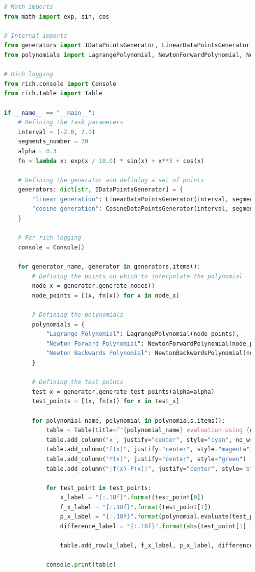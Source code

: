 \documentclass[12pt]{extarticle}
\begin{document}
\begin{lstlisting}[language=Python, caption=Реалізація побудови таблиць з результатами]
# Math imports
from math import exp, sin, cos

# Internal imports
from generators import IDataPointsGenerator, LinearDataPointsGenerator, CosineDataPointsGenerator
from polynomials import LagrangePolynomial, NewtonForwardPolynomial, NewtonBackwardsPolynomial

# Rich logging
from rich.console import Console
from rich.table import Table

if __name__ == "__main__":
    # Defining the task parameters
    interval = (-2.0, 2.0)
    segments_number = 20
    alpha = 0.3
    fn = lambda x: exp(x / 10.0) * sin(x) + x**3 + cos(x)
    
    # Defining the generator and defining a set of points
    generators: dict[str, IDataPointsGenerator] = {
        "linear generation": LinearDataPointsGenerator(interval, segments_number),
        "cosine generation": CosineDataPointsGenerator(interval, segments_number)
    }
    
    # For rich logging
    console = Console()
    
    for generator_name, generator in generators.items():
        # Defining the points on which to interpolate the polynomial
        node_x = generator.generate_nodes()
        node_points = [(x, fn(x)) for x in node_x]
        
        # Defining the polynomials
        polynomials = {
            "Lagrange Polynomial": LagrangePolynomial(node_points),
            "Newton Forward Polynomial": NewtonForwardPolynomial(node_points),
            "Newton Backwards Polynomial": NewtonBackwardsPolynomial(node_points)
        }
        
        # Defining the test points
        test_x = generator.generate_test_points(alpha=alpha)
        test_points = [(x, fn(x)) for x in test_x]
        
        for polynomial_name, polynomial in polynomials.items():
            table = Table(title=f"{polynomial_name} evaluation using {generator_name}")
            table.add_column("x", justify="center", style="cyan", no_wrap=True)
            table.add_column("f(x)", justify="center", style="magenta")
            table.add_column("P(x)", justify="center", style="green")
            table.add_column("|f(x)-P(x)|", justify="center", style="blue")
        
            for test_point in test_points:
                x_label = "{:.18f}".format(test_point[0])
                f_x_label = "{:.18f}".format(test_point[1])
                p_x_label = "{:.18f}".format(polynomial.evaluate(test_point[0]))
                difference_label = "{:.18f}".format(abs(test_point[1] - polynomial.evaluate(test_point[0])))
                
                table.add_row(x_label, f_x_label, p_x_label, difference_label)

            console.print(table)
\end{lstlisting}
\end{document}
